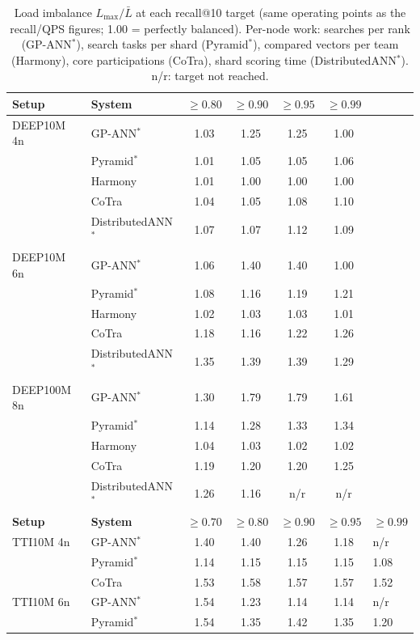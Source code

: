 \begin{table}[t]
\centering
\small
\caption{Load imbalance $L_{\max}/\bar{L}$ at each recall@10 target (same operating points as the recall/QPS figures; 1.00 = perfectly balanced). Per-node work: searches per rank (GP-ANN$^*$), search tasks per shard (Pyramid$^*$), compared vectors per team (Harmony), core participations (CoTra), shard scoring time (DistributedANN$^*$). n/r: target not reached.}
\label{tab:load-imbalance}
\begin{tabular}{llcccc}
\toprule
\textbf{Setup} & \textbf{System} & $\geq 0.80$ & $\geq 0.90$ & $\geq 0.95$ & $\geq 0.99$ \\
\midrule
DEEP10M 4n & GP-ANN$^*$ & 1.03 & 1.25 & 1.25 & 1.00 \\
 & Pyramid$^*$ & 1.01 & 1.05 & 1.05 & 1.06 \\
 & Harmony & 1.01 & 1.00 & 1.00 & 1.00 \\
 & CoTra & 1.04 & 1.05 & 1.08 & 1.10 \\
 & DistributedANN$^*$ & 1.07 & 1.07 & 1.12 & 1.09 \\
\addlinespace
DEEP10M 6n & GP-ANN$^*$ & 1.06 & 1.40 & 1.40 & 1.00 \\
 & Pyramid$^*$ & 1.08 & 1.16 & 1.19 & 1.21 \\
 & Harmony & 1.02 & 1.03 & 1.03 & 1.01 \\
 & CoTra & 1.18 & 1.16 & 1.22 & 1.26 \\
 & DistributedANN$^*$ & 1.35 & 1.39 & 1.39 & 1.29 \\
\addlinespace
DEEP100M 8n & GP-ANN$^*$ & 1.30 & 1.79 & 1.79 & 1.61 \\
 & Pyramid$^*$ & 1.14 & 1.28 & 1.33 & 1.34 \\
 & Harmony & 1.04 & 1.03 & 1.02 & 1.02 \\
 & CoTra & 1.19 & 1.20 & 1.20 & 1.25 \\
 & DistributedANN$^*$ & 1.26 & 1.16 & n/r & n/r \\
\midrule
\textbf{Setup} & \textbf{System} & $\geq 0.70$ & $\geq 0.80$ & $\geq 0.90$ & $\geq 0.95$ & $\geq 0.99$ \\
\midrule
TTI10M 4n & GP-ANN$^*$ & 1.40 & 1.40 & 1.26 & 1.18 & n/r \\
 & Pyramid$^*$ & 1.14 & 1.15 & 1.15 & 1.15 & 1.08 \\
 & CoTra & 1.53 & 1.58 & 1.57 & 1.57 & 1.52 \\
\addlinespace
TTI10M 6n & GP-ANN$^*$ & 1.54 & 1.23 & 1.14 & 1.14 & n/r \\
 & Pyramid$^*$ & 1.54 & 1.35 & 1.42 & 1.35 & 1.20 \\

\end{tabular}
\end{table}
